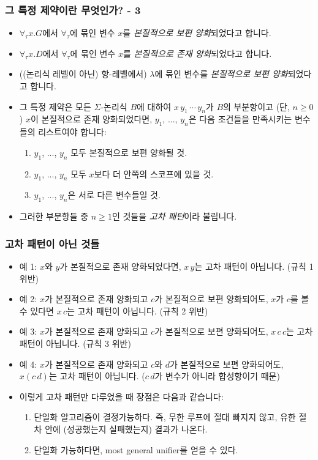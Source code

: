 \documentclass[slidestop,compress,mathserif]{beamer}
\begin{document}
    \begin{frame}
        \frametitle{그 특정 제약이란 무엇인가? - 3}
        \begin{itemize}
            \item $\forall_{\tau} x . G$에서 $\forall_{\tau}$에 묶인 변수 $x$를 \textit{본질적으로 보편 양화}되었다고 합니다.
            \item $\forall_{\tau} x . D$에서 $\forall_{\tau}$에 묶인 변수 $x$를 \textit{본질적으로 존재 양화}되었다고 합니다.
            \item ((논리식 레벨이 아닌) 항-레벨에서) $\lambda$에 묶인 변수를 \textit{본질적으로 보편 양화}되었다고 합니다.
            \item 그 특정 제약은 모든 $\Sigma$-논리식 $B$에 대하여 $x \, y_1 \, \cdots \, y_n$가 $B$의 부분항이고 (단, $n \geq 0$) $x$이 본질적으로 존재 양화되었다면, $y_1$, ..., $y_n$은 다음 조건들을 만족시키는 변수들의 리스트여야 합니다:
            \begin{enumerate}
                \item $y_1$, ..., $y_n$ 모두 본질적으로 보편 양화될 것.
                \item $y_1$, ..., $y_n$ 모두 $x$보다 더 안쪽의 스코프에 있을 것.
                \item $y_1$, ..., $y_n$은 서로 다른 변수들일 것.
            \end{enumerate}
            \item 그러한 부분항들 중 $n \geq 1$인 것들을 \textit{고차 패턴}이라 불립니다.
        \end{itemize}
    \end{frame}

    \begin{frame}
        \frametitle{고차 패턴이 아닌 것들}
        \begin{itemize}
            \item 예 1: $x$와 $y$가 본질적으로 존재 양화되었다면, $x \, y$는 고차 패턴이 아닙니다. (규칙 1 위반)
            \item 예 2: $x$가 본질적으로 존재 양화되고 $c$가 본질적으로 보편 양화되어도, $x$가 $c$를 볼 수 있다면 $x \, c$는 고차 패턴이 아닙니다. (규칙 2 위반)
            \item 예 3: $x$가 본질적으로 존재 양화되고 $c$가 본질적으로 보편 양화되어도, $x \, c \, c$는 고차 패턴이 아닙니다. (규칙 3 위반)
            \item 예 4: $x$가 본질적으로 존재 양화되고 $c$와 $d$가 본질적으로 보편 양화되어도, $x \left( c \, d \right)$는 고차 패턴이 아닙니다. ($ c \, d$가 변수가 아니라 합성항이기 때문)
            \item 이렇게 고차 패턴만 다루었을 때 장점은 다음과 같습니다:
            \begin{enumerate}
                \item 단일화 알고리즘이 결정가능하다. 즉, 무한 루프에 절대 빠지지 않고, 유한 절차 안에 (성공했는지 실패했는지) 결과가 나온다.
                \item 단일화 가능하다면, most general unifier를 얻을 수 있다.
            \end{enumerate}
        \end{itemize}
    \end{frame}
\end{document}

